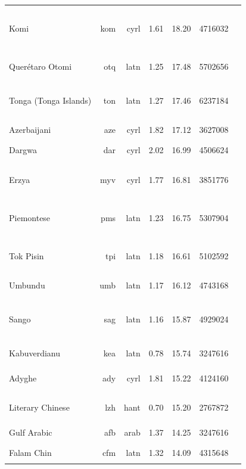 \documentclass[11pt]{article}
\begin{document}
\begin{center}
\begin{longtable}[width=0.9\textwidth]{|lrrrrrl|}
Komi & kom & cyrl & 1.61 & 18.20 & 4716032 & {\color{oscar}\rule{0.03cm}{8pt}}{\color{madlad400}\rule{1.02cm}{8pt}}{\color{glot500}\rule{0.44cm}{8pt}}{\color{other}\rule{2.51cm}{8pt}} \\ 
Querétaro Otomi & otq & latn & 1.25 & 17.48 & 5702656 & {\color{madlad400}\rule{3.81cm}{8pt}}{\color{other}\rule{0.18999999999999995cm}{8pt}} \\ 
Tonga (Tonga Islands) & ton & latn & 1.27 & 17.46 & 6237184 & {\color{madlad400}\rule{3.32cm}{8pt}}{\color{glot500}\rule{0.07cm}{8pt}}{\color{other}\rule{0.6100000000000003cm}{8pt}} \\ 
Azerbaijani & aze & cyrl & 1.82 & 17.12 & 3627008 & {\color{madlad400}\rule{4.0cm}{8pt}} \\ 
Dargwa & dar & cyrl & 2.02 & 16.99 & 4506624 & {\color{other}\rule{4.0cm}{8pt}} \\ 
Erzya & myv & cyrl & 1.77 & 16.81 & 3851776 & {\color{oscar}\rule{0.0cm}{8pt}}{\color{madlad400}\rule{1.63cm}{8pt}}{\color{glot500}\rule{0.54cm}{8pt}}{\color{other}\rule{1.83cm}{8pt}} \\ 
Piemontese & pms & latn & 1.23 & 16.75 & 5307904 & {\color{oscar}\rule{0.27cm}{8pt}}{\color{glot500}\rule{2.23cm}{8pt}}{\color{other}\rule{1.5cm}{8pt}} \\ 
Tok Pisin & tpi & latn & 1.18 & 16.61 & 5102592 & {\color{nllb}\rule{1.92cm}{8pt}}{\color{glot500}\rule{0.77cm}{8pt}}{\color{other}\rule{1.31cm}{8pt}} \\ 
Umbundu & umb & latn & 1.17 & 16.12 & 4743168 & {\color{nllb}\rule{4.0cm}{8pt}}{\color{glot500}\rule{0.0cm}{8pt}} \\ 
Sango & sag & latn & 1.16 & 15.87 & 4929024 & {\color{nllb}\rule{1.37cm}{8pt}}{\color{madlad400}\rule{2.42cm}{8pt}}{\color{glot500}\rule{0.2cm}{8pt}}{\color{other}\rule{0.009999999999999787cm}{8pt}} \\ 
Kabuverdianu & kea & latn & 0.78 & 15.74 & 3247616 & {\color{nllb}\rule{4.0cm}{8pt}}{\color{glot500}\rule{0.0cm}{8pt}} \\ 
Adyghe & ady & cyrl & 1.81 & 15.22 & 4124160 & {\color{madlad400}\rule{3.02cm}{8pt}}{\color{other}\rule{0.98cm}{8pt}} \\ 
Literary Chinese & lzh & hant & 0.70 & 15.20 & 2767872 & {\color{glot500}\rule{1.84cm}{8pt}}{\color{other}\rule{2.16cm}{8pt}} \\ 
Gulf Arabic & afb & arab & 1.37 & 14.25 & 3247616 & {\color{glot500}\rule{4.0cm}{8pt}}{\color{other}\rule{0.0cm}{8pt}} \\ 
Falam Chin & cfm & latn & 1.32 & 14.09 & 4315648 & {\color{madlad400}\rule{4.0cm}{8pt}} \\ 

\end{longtable}
\end{center}
\end{document}
